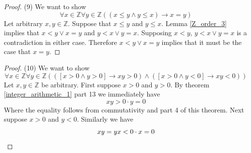 \documentclass{report}
\begin{document}
\begin{proof}(9)
We want to show
\begin{equation*}
\forall x\in\mathbb Z\forall y\in\mathbb Z((x\leq y\land y\leq x)\to x=y)
\end{equation*}
Let arbitrary $x,y\in\mathbb Z$. Suppose that $x\leq y$ and $y\leq x$. Lemma \ref{Z_order_3} implies that
$x<y\lor x=y$ and $y<x\lor y=x$.
Supposing $x<y$, $y<x\lor y=x$ is a contradiction in either case. Therefore $x<y\lor x=y$ implies that it must be
the case that $x=y$.
\end{proof}
\begin{proof}(10)
We want to show
\begin{equation*}
\forall x\in\mathbb Z\forall y\in\mathbb Z(([x>0\land y>0]\to xy>0)\land([x>0\land y<0]\to xy<0))
\end{equation*}
Let $x,y\in\mathbb Z$ be arbitrary. First suppose $x>0$ and $y>0$. By theorem \ref{integer_arithmetic_1} part 13 we immediately
have
\begin{equation*}
xy>0\cdot y=0
\end{equation*}
Where the equality follows from commutativity and part 4 of this theorem.
Next suppose $x>0$ and $y<0$. Similarly we have
\begin{equation*}
xy=yx<0\cdot x=0\qedhere
\end{equation*}
\end{proof}
\newpage
\end{document}

